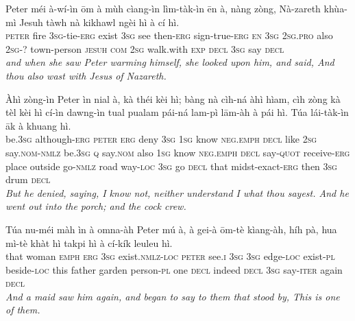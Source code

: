 \documentclass[11pt,a4paper]{article}
\begin{document}
\begin{exe}
\gll Peter méi à-wí-ìn ōm à mùh cìang-ìn lìm-tàk-ìn ēn à, nàng zòng, Nà-zareth khùa-mì Jesuh tàwh nà kikhawl ngèi hì à cí hì. \\
     \textsc{peter} fire \textsc{3sg}-tie-\textsc{erg} exist \textsc{3sg} see then-\textsc{erg} sign-true-\textsc{erg} \textsc{en} \textsc{3sg} \textsc{2sg}.\textsc{pro} also \textsc{2sg}-? town-person \textsc{jesuh} \textsc{com} \textsc{2sg} walk.with \textsc{exp} \textsc{decl} \textsc{3sg} say \textsc{decl} \\
\glt \textcolor{kjvcolor}{\textit{and when she saw Peter warming himself, she looked upon him, and said, And thou also wast with Jesus of Nazareth.}}

\gll Àhì zòng-ìn Peter ìn nial à, kà théi kèi hì; bàng nà cìh-ná àhì hìam, cìh zòng kà tèl kèi hì cí-ìn dawng-ìn tual pualam pái-ná lam-pì lām-àh à pái hì. Túa lái-tàk-ìn āk à khuang hì. \\
     be.\textsc{3sg} although-\textsc{erg} \textsc{peter} \textsc{erg} deny \textsc{3sg} \textsc{1sg} know \textsc{neg}.\textsc{emph} \textsc{decl} like \textsc{2sg} say.\textsc{nom}-\textsc{nmlz} be.\textsc{3sg} \textsc{q} say.\textsc{nom} also \textsc{1sg} know \textsc{neg}.\textsc{emph} \textsc{decl} say-\textsc{quot} receive-\textsc{erg} place outside go-\textsc{nmlz} road way-\textsc{loc} \textsc{3sg} go \textsc{decl} that midst-exact-\textsc{erg} then \textsc{3sg} drum \textsc{decl} \\
\glt \textcolor{kjvcolor}{\textit{But he denied, saying, I know not, neither understand I what thou sayest. And he went out into the porch; and the cock crew.}}

\gll Túa nu-méi màh ìn à omna-àh Peter mú à, à gei-à ōm-tè kìang-àh, híh pà, hua mì-tè khàt hì takpi hì à cí-kík leuleu hì. \\
     that woman \textsc{emph} \textsc{erg} \textsc{3sg} exist.\textsc{nmlz}-\textsc{loc} \textsc{peter} see.\textsc{i} \textsc{3sg} \textsc{3sg} edge-\textsc{loc} exist-\textsc{pl} beside-\textsc{loc} this father garden person-\textsc{pl} one \textsc{decl} indeed \textsc{decl} \textsc{3sg} say-\textsc{iter} again \textsc{decl} \\
\glt \textcolor{kjvcolor}{\textit{And a maid saw him again, and began to say to them that stood by, This is one of them.}}


\end{exe}
\end{document}
